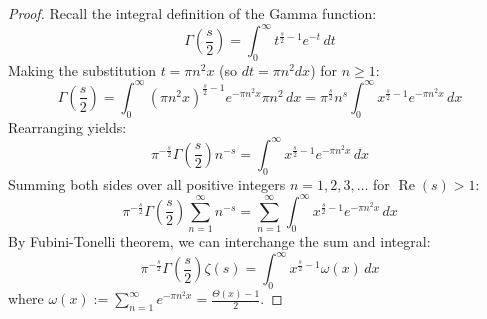 \documentclass[a4paper]{article}
\begin{document}
\begin{proof}
Recall the integral definition of the Gamma function:
\[
    \Gamma\left(\frac{s}{2}\right) = \int_0^{\infty} t^{\frac{s}{2}-1} e^{-t} \, dt
\]
Making the substitution $t = \pi n^2 x$ (so $dt = \pi n^2 dx$) for $n \ge 1$:
\[
    \Gamma\left(\frac{s}{2}\right) = \int_0^{\infty} (\pi n^2 x)^{\frac{s}{2}-1} e^{-\pi n^2 x} \pi n^2 \, dx = \pi^{\frac{s}{2}} n^s \int_0^{\infty} x^{\frac{s}{2}-1} e^{-\pi n^2 x} \, dx
\]
Rearranging yields:
\[
    \pi^{-\frac{s}{2}} \Gamma\left(\frac{s}{2}\right) n^{-s} = \int_0^{\infty} x^{\frac{s}{2}-1} e^{-\pi n^2 x} \, dx
\]
Summing both sides over all positive integers $n=1, 2, 3, \dots$ for $\operatorname{Re}(s) > 1$:
\[
    \pi^{-\frac{s}{2}} \Gamma\left(\frac{s}{2}\right) \sum_{n=1}^{\infty} n^{-s} = \sum_{n=1}^{\infty} \int_0^{\infty} x^{\frac{s}{2}-1} e^{-\pi n^2 x} \, dx
\]
By Fubini-Tonelli theorem, we can interchange the sum and integral:
\[
    \pi^{-\frac{s}{2}} \Gamma\left(\frac{s}{2}\right) \zeta(s) = \int_0^{\infty} x^{\frac{s}{2}-1} \omega(x) \, dx
\]
where $\omega(x) := \sum_{n=1}^{\infty} e^{-\pi n^2 x} = \frac{\Theta(x) - 1}{2}$.


\end{proof}
\end{document}
